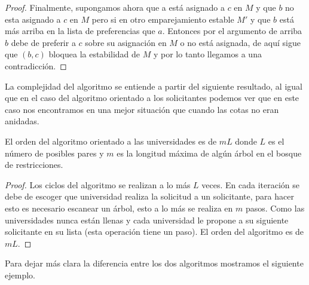 \begin{proof}
Finalmente, supongamos ahora que a está asignado a $c$ en $M$ y que $b$ no esta asignado a $c$ en $M$ pero si en otro emparejamiento estable $M'$ y que $b$ está más arriba en la lista de preferencias que $a$. Entonces por el argumento de arriba $b$ debe de preferir a $c$ sobre su asignación en $M$ o no está asignada, de aquí sigue que $(b,c)$ bloquea la estabilidad de $M$ y por lo tanto llegamos a una contradicción. 
\end{proof}

La complejidad del algoritmo se entiende a partir del siguiente resultado, al igual que en el caso del algoritmo orientado a los solicitantes podemos ver que en este caso nos encontramos en una mejor situación que cuando las cotas no eran anidadas. 

\begin{teo}
El orden del algoritmo orientado a las universidades es de $mL$ donde $L$ es el número de posibles pares y $m$ es la longitud máxima de algún árbol en el bosque de restricciones. 
\end{teo}

\begin{proof}
Los ciclos del algoritmo se realizan a lo más $L$ veces. En cada iteración se debe de escoger que universidad realiza la solicitud a un solicitante, para hacer esto es necesario escanear un árbol, esto a lo más se realiza en $m$ pasos. Como las universidades nunca están llenas y cada universidad le propone a su siguiente solicitante en su lista (esta operación tiene un paso). El orden del algoritmo es de $mL$.
\end{proof}

Para dejar más clara la diferencia entre los dos algoritmos mostramos el siguiente ejemplo.

